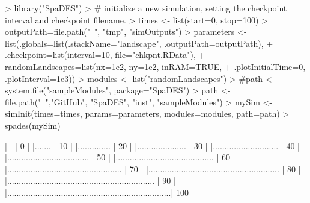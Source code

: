 \documentclass{article}
\begin{document}
\begin{Schunk}
\begin{Sinput}
> library("SpaDES")
> # initialize a new simulation, setting the checkpoint interval and checkpoint filename.
> times <- list(start=0, stop=100)
> outputPath=file.path("~", "tmp", "simOutputs")
> parameters <- list(.globals=list(.stackName="landscape", .outputPath=outputPath),
+                    .checkpoint=list(interval=10, file="chkpnt.RData"),
+                    randomLandscapes=list(nx=1e2, ny=1e2, inRAM=TRUE,
+                                          .plotInitialTime=0, .plotInterval=1e3))
> modules <- list("randomLandscapes")
> #path <- system.file("sampleModules", package="SpaDES")
> path <- file.path("~","GitHub", "SpaDES", "inst", "sampleModules")
> mySim <- simInit(times=times, params=parameters, modules=modules, path=path)
> spades(mySim)
\end{Sinput}
\begin{Soutput}
  |                                                                            
  |                                                                      |   0%
  |                                                                            
  |.......                                                               |  10%
  |                                                                            
  |..............                                                        |  20%
  |                                                                            
  |.....................                                                 |  30%
  |                                                                            
  |............................                                          |  40%
  |                                                                            
  |...................................                                   |  50%
  |                                                                            
  |..........................................                            |  60%
  |                                                                            
  |.................................................                     |  70%
  |                                                                            
  |........................................................              |  80%
  |                                                                            
  |...............................................................       |  90%
  |                                                                            
  |......................................................................| 100%
\end{Soutput}
\end{Schunk}
\end{document}
